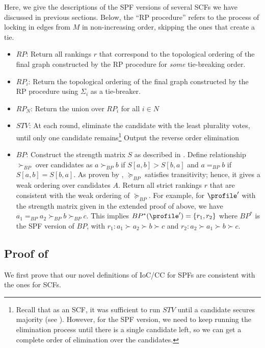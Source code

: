 Here, we give the descriptions of the SPF versions of several SCFs we have discussed in previous sections. Below, the ``RP procedure'' refers to the process of locking in edges from $M$ in non-increasing order, skipping the ones that create a tie. 
\begin{itemize}
    \item $RP$: Return all rankings $r$ that correspond to the topological ordering of the final graph constructed by the RP procedure for \emph{some} tie-breaking order.
    \item  $RP_i$: Return the topological ordering of the final graph constructed by the RP procedure using $\Sigma_i$ as a tie-breaker.
    \item  $RP_N$: Return the union over $RP_i$ for all $i \in N$
    \item $STV$: At each round, eliminate the candidate with the least plurality votes, until only one candidate remains\footnote{Recall that as an SCF, it was sufficient to run $STV$ until a candidate secures majority (see ). However, for the SPF version, we need to keep running the elimination process until there is a single candidate left, so we can get a complete order of elimination over the candidates.} Output the reverse order elimination 
    \item $BP$: Construct the strength matrix $S$ as described in . Define relationship $\succ_{BP}$ over candidates as $a \succ_{BP} b$ if $S[a,b]>S[b,a]$ and  $a =_{BP} b$ if $S[a,b]= S[b,a]$. As proven by \citet{Schulze10:New}, $\succeq_{BP}$ satisfies transitivity; hence, it gives a weak ordering over candidates $A$. Return all strict rankings $r$ that are consistent with the weak ordering of $\succeq_{BP}$. For example, for $\profile'$ with the strength matrix given in the extended proof of  above, we have $a_1=_{BP}a_2 \succ_{BP} b \succ_{BP} c$. This implies $BP^*(\profile') =\{r_1,r_2\}$ where $BP^*$ is the SPF version of $BP$, with $r_1 : a_1 \succ a_2 \succ b\succ  c$ and $r_2 : a_2 \succ a_1 \succ b\succ  c$.
\end{itemize}
\subsection{Proof of }
We first prove that our novel definitions of IoC/CC for SPFs are consistent with the ones for SCFs.

\spfscf*

